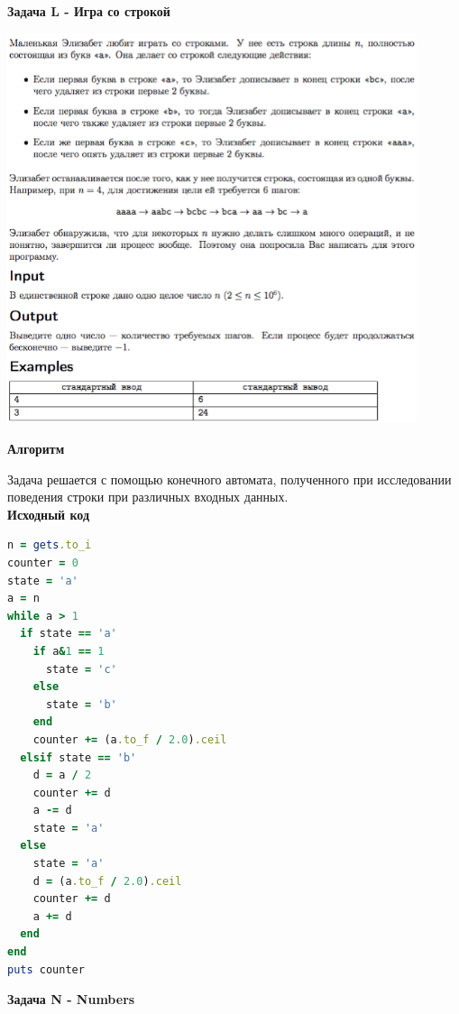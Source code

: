 \documentclass[a4paper,12pt]{article}
\begin{document}
\newpage
\textbf{{\large Задача L - Игра со строкой}}

\begin{center}
\includegraphics[width=0.9\textwidth]{OC_Bashkortostan/L.png}\\ [1cm]
\end{center}

\textbf{{\large Алгоритм}}

Задача решается с помощью конечного автомата, полученного при исследовании поведения строки при различных входных данных. \\

\newpage
\textbf{{\large Исходный код}} \\
\begin{lstlisting}[language=Ruby]
n = gets.to_i
counter = 0
state = 'a'
a = n
while a > 1
  if state == 'a'
    if a&1 == 1
      state = 'c'
    else
      state = 'b'
    end
    counter += (a.to_f / 2.0).ceil
  elsif state == 'b'
    d = a / 2
    counter += d
    a -= d
    state = 'a'
  else
    state = 'a'
    d = (a.to_f / 2.0).ceil
    counter += d
    a += d
  end
end
puts counter
\end{lstlisting}


\newpage
\textbf{{\large Задача N - Numbers}}
\end{document}
